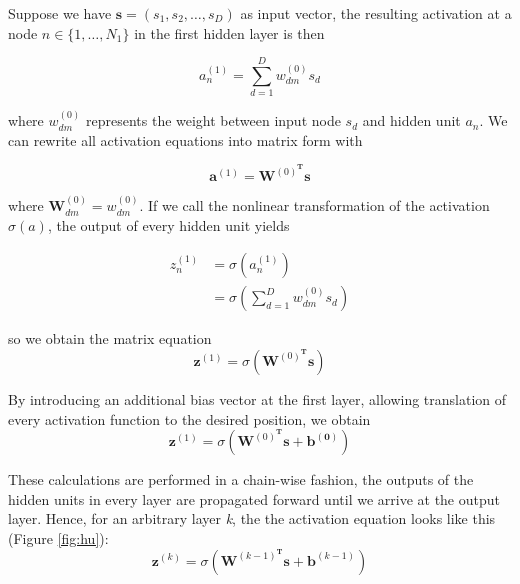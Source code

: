 Suppose we have $\mathbf{s}=(s_1,s_2,\dotsc,s_D)$ as input vector, the resulting activation at a node $n \in \{1,\dotsc,N_1\}$ in the first hidden layer is then

\begin{equation}
a^{(1)}_n = \sum_{d=1}^{D} w^{(0)}_{dm} s_d
\end{equation}

where $w^{(0)}_{dm}$ represents the weight between input node $s_d$ and hidden unit $a_n$. We can rewrite all activation equations into matrix form with

\begin{equation}
\mathbf{a}^{(1)}=\mathbf{W}^{(0)^{\mathbf{T}}} \mathbf{s}
\end{equation}

where $\mathbf{W}^{(0)}_{dm}=w^{(0)}_{dm}$. If we call the nonlinear transformation of the activation $\sigma(a)$, the output of every hidden unit yields

\begin{align}
z^{(1)}_{n} &= \sigma (a^{(1)}_{n}) \\
	  &= \sigma \left(\sum_{d=1}^{D} w^{(0)}_{dm} s_d\right)
\end{align}

so we obtain the matrix equation
\begin{equation}
\mathbf{z}^{(1)}=\sigma \left(\mathbf{W}^{(0)^{\mathbf{T}}} \mathbf{s}\right)
\end{equation}

By introducing an additional bias vector at the first layer, allowing translation of every activation function to the desired position, we obtain
\begin{equation}
\mathbf{z}^{(1)}=\sigma \left(\mathbf{W}^{(0)^{\mathbf{T}}} \mathbf{s} + \mathbf{b^{(0)}}\right)
\end{equation}

These calculations are performed in a chain-wise fashion, the outputs of the hidden units in every layer are propagated forward until we arrive at the output layer. Hence, for an arbitrary layer \textit{k}, the the activation equation looks like this (Figure \ref{fig:hu}):
\begin{equation}
\mathbf{z}^{(k)}=\sigma \left(\mathbf{W}^{(k-1)^{\mathbf{T}}} \mathbf{s} + \mathbf{b}^{(k-1)}\right)
\end{equation}

